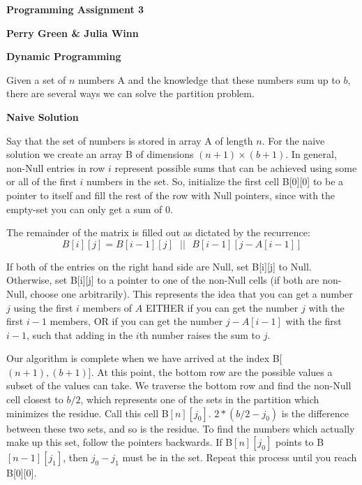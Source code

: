 \documentclass[12pt]{article}
\begin{document}
\begin{center} \textbf{Programming Assignment 3} \end{center}
 \vspace{-8mm} 
\begin{center} \textbf{Perry Green \& Julia Winn} \end{center}

\noindent \textbf{Dynamic Programming}
\medskip

\noindent Given a set of $n$ numbers A and the knowledge that these numbers sum up to $b$, there are several ways we can solve the partition problem.
\medskip

\noindent \textbf{Naive Solution}
\medskip

\noindent Say that the set of numbers is stored in array A of length $n$. For the naive solution we create an array B of dimensions $(n+1) \times (b+1)$.  In general, non-Null entries in row $i$ represent possible sums that can be achieved using some or all of the first $i$ numbers in the set. So, initialize the first cell B[0][0] to be a pointer to itself and fill the rest of the row with Null pointers, since with the empty-set you can only get a sum of 0.
\medskip

\noindent The remainder of the matrix is filled out as dictated by the recurrence: 
$$B[i][j] = B[i-1][j] \textbf{ } || \textbf{ } B[i-1][j-A[i-1]]$$

\noindent If both of the entries on the right hand side are Null, set B[i][j] to Null. Otherwise, set B[i][j] to a pointer to one of the non-Null cells (if both are non-Null, choose one arbitrarily). This represents the idea that you can get a number $j$ using the first $i$ members of $A$ EITHER if you can get the number $j$ with the first $i-1$ members, OR if you can get the number $j-A[i-1]$ with the first $i-1$, such that adding in the $i$th number raises the sum to $j$.
\medskip

\noindent Our algorithm is complete when we have arrived at the index B[$(n+1),(b+1)]$.  At this point, the bottom row are the possible values a subset of the values can take. We traverse the bottom row and find the non-Null cell closest to $b/2$, which represents one of the sets in the partition which minimizes the residue.  Call this cell B$[n][j_0]$. $2*(b/2-j_0)$ is the difference between these two sets, and so is the residue. To find the numbers which actually make up this set, follow the pointers backwards. If B$[n][j_0]$ points to B$[n-1][j_1]$, then $j_0-j_1$ must be in the set. Repeat this process until you reach B[0][0].
\medskip
\end{document}
